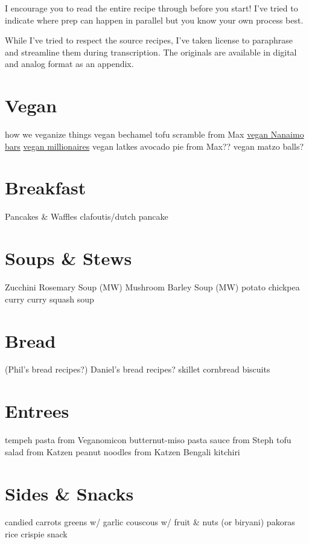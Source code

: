\documentclass{article}
\begin{document}
I encourage you to read the entire recipe through before you start! I've tried to indicate where prep can happen in parallel but you know your own process best.

While I've tried to respect the source recipes, I've taken license to paraphrase and streamline them during transcription. The originals are available in digital and analog format as an appendix.

\section{Vegan}
how we veganize things
vegan bechamel
tofu scramble from Max
\href{http://sabotabby.livejournal.com/1344653.html}{vegan Nanaimo bars}
\href{http://sabotabby.livejournal.com/1372333.html}{vegan millionaires}
vegan latkes
avocado pie from Max??
vegan matzo balls?


\section{Breakfast}
% 



Pancakes \& Waffles
clafoutis/dutch pancake

\section{Soups \& Stews}

Zucchini Rosemary Soup (MW)
Mushroom Barley Soup (MW)
potato chickpea curry
curry squash soup

\section{Bread}
 (Phil’s bread recipes?)
Daniel’s bread recipes?
skillet cornbread
biscuits

\section{Entrees}
tempeh pasta from Veganomicon
butternut-miso pasta sauce from Steph
tofu salad from Katzen
peanut noodles from Katzen
Bengali kitchiri

\section{Sides \& Snacks}
candied carrots
greens w/ garlic
couscous w/ fruit & nuts (or biryani)
pakoras
rice crispie snack
\end{document}
